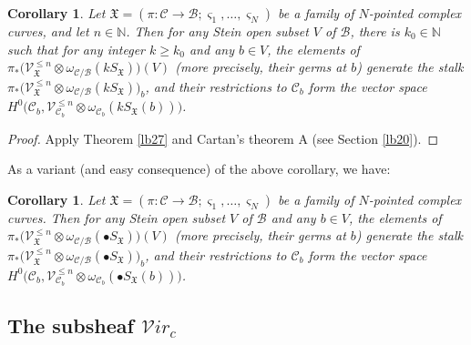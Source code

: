 \documentclass[12pt,a4paper,notitlepage]{report}
\theoremstyle{definition}
\theoremstyle{plain}
\newtheorem{co}[df]{Corollary}
\newcommand{\fk}{\mathfrak}
\newcommand{\mc}{\mathcal}
\newcommand{\scr}{\mathscr}
\newcommand{\sgm}{\varsigma}
\newcommand{\SX}{S_{\fk X}}
\newcommand{\blt}{\bullet}
\newcommand{\Nbb}{\mathbb N}
\newcommand{\svir}{\mathcal V\!\mathit{ir}}
\numberwithin{equation}{section}
\begin{document}
\begin{co}
Let $\fk X=(\pi:\mc C\rightarrow\mc B;\sgm_1,\dots,\sgm_N)$ be a family of $N$-pointed complex curves, and let $n\in\Nbb$. Then for any  Stein open subset $V$ of $\mc B$, there is $k_0\in\Nbb$ such that for  any integer $k\geq k_0$ and any $b\in V$,   the elements of $\pi_*\big(\scr V_{\fk X}^{\leq n}\otimes\omega_{\mc C/\mc B}(k\SX)\big)(V)$ (more precisely, their germs at $b$) generate the stalk $\pi_*\big(\scr V_{\fk X}^{\leq n}\otimes\omega_{\mc C/\mc B}(k\SX)\big)_b$, and their restrictions to $\mc C_b$ form the vector space $H^0\big(\mc C_b,\scr V_{\mc C_b}^{\leq n}\otimes\omega_{\mc C_b}(k\SX(b))\big)$.
\end{co}

\begin{proof}
Apply Theorem \ref{lb27}  and Cartan's theorem A (see Section \ref{lb20}). 
\end{proof}

As a variant (and easy consequence) of the above corollary, we have:

\begin{co}\label{lb33}
Let $\fk X=(\pi:\mc C\rightarrow\mc B;\sgm_1,\dots,\sgm_N)$ be a family of $N$-pointed complex curves. Then for any  Stein open subset $V$ of $\mc B$ and any $b\in V$, the elements of $\pi_*\big(\scr V_{\fk X}^{\leq n}\otimes\omega_{\mc C/\mc B}(\blt\SX)\big)(V)$ (more precisely, their germs at $b$) generate the stalk $\pi_*\big(\scr V_{\fk X}^{\leq n}\otimes\omega_{\mc C/\mc B}(\blt\SX)\big)_b$, and their restrictions to $\mc C_b$ form the vector space $H^0\big(\mc C_b,\scr V_{\mc C_b}^{\leq n}\otimes\omega_{\mc C_b}(\blt\SX(b))\big)$.
\end{co}


\subsection*{The subsheaf $\svir_c$}
\end{document}
